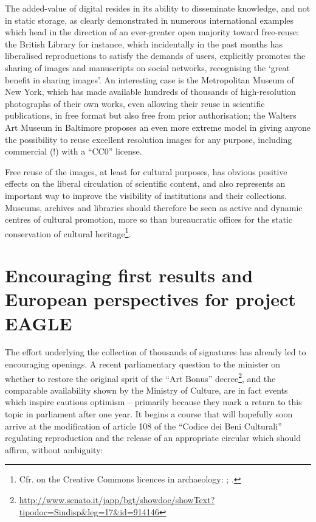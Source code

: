 \documentclass[amsthm,ebook]{saparticle}
\begin{document}
The added-value of digital resides in its ability to disseminate knowledge, and not in static storage, as clearly
demonstrated in numerous international examples which head in the direction of an ever-greater open majority toward
free-reuse: the British Library for instance, which incidentally in the past months has liberalised reproductions to
satisfy the demands of users, explicitly promotes the sharing of images and manuscripts on social networks, recognising
the `great benefit in sharing images’. An interesting case is the Metropolitan Museum of New York, which has made
available hundreds of thousands of high-resolution photographs of their own works, even allowing their reuse in
scientific publications, in free format but also free from prior authorisation; the Walters Art Museum in Baltimore
proposes an even more extreme model in giving anyone the possibility to reuse excellent resolution images for any
purpose, including commercial (!) with a ``CC0'' license.

Free reuse of the images, at least for cultural purposes, has obvious positive effects on the liberal circulation of
scientific content, and also represents an important way to improve the visibility of institutions and their
collections. Museums, archives and libraries should therefore be seen as active and dynamic centres of cultural
promotion, more so than bureaucratic offices for the static conservation of cultural heritage\footnote{Cfr. on the
Creative Commons licences in archaeology: \citet{brugnoli_fotografia_2013}; \citet{gualandi}.}.




\section{Encouraging first results and European perspectives for project EAGLE}



The effort underlying the collection of thousands of signatures has already led to encouraging openings. A recent
parliamentary question to the minister on whether to restore the original sprit of the ``Art Bonus''
decree\footnote{\url{http://www.senato.it/japp/bgt/showdoc/showText?tipodoc=Sindisp\&leg=17\&id=914146}}, and the
comparable availability shown by the Ministry of Culture, are in fact events which inspire cautious optimism –
primarily because they mark a return to this topic in parliament after one year. It begins a course that will hopefully
soon arrive at the modification of article 108 of the ``Codice dei Beni Culturali'' regulating reproduction and the
release of an appropriate circular which should affirm, without ambiguity:
\end{document}
